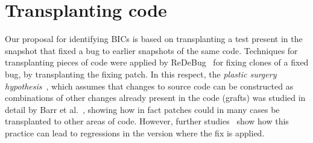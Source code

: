 \section{Transplanting code}


Our proposal for identifying BICs is based on transplanting a test present in the snapshot that fixed a bug to earlier snapshots of the same code. Techniques for transplanting pieces of code were applied by ReDeBug~\cite{jang2012redebug} for fixing clones of a fixed bug, by transplanting the fixing patch. In this respect, the \emph{plastic surgery hypothesis}~\cite{harman2010:automated_patching}, which assumes that changes to source code can be constructed as combinations of other changes already present in the code (grafts) was studied in detail by Barr et al.~\cite{barr2014plastic}, showing how in fact patches could in many cases be transplanted to other areas of code. However, further studies~\cite{castelluccio2019empirical} show how this practice can lead to regressions in the version where the fix is applied.


